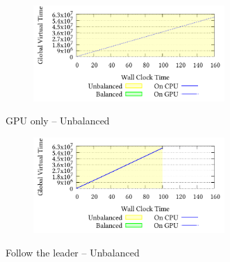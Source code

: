 \documentclass[]{article}
\begin{document}
\setcounter{figure}{1}
\renewcommand{\thefigure}{\arabic{figure}e}
\begin{figure}[!h]
\centering
\begin{subfigure}[b]{\mysize}
\centering
\includegraphics[width=0.8\textwidth]{figures_original/unbalanced/2.processed.pdf}
\renewcommand{\thesubfigure}{Original}
\caption{}
\end{subfigure}
\begin{subfigure}[b]{\mysize}
\centering
{}
\renewcommand{\thesubfigure}{Reproduced}
\caption{}
\end{subfigure}
\caption{GPU only – Unbalanced}
\end{figure}



\setcounter{figure}{1}
\renewcommand{\thefigure}{\arabic{figure}h}
\begin{figure}[!h]
\centering
\begin{subfigure}[b]{\mysize}
\centering
\includegraphics[width=0.8\textwidth]{figures_original/unbalanced/3.processed.pdf}
\renewcommand{\thesubfigure}{Original}
\caption{}
\end{subfigure}
\begin{subfigure}[b]{\mysize}
\centering
{}
\renewcommand{\thesubfigure}{Reproduced}
\caption{}
\end{subfigure}
\caption{Follow the leader – Unbalanced}
\end{figure}
\end{document}
